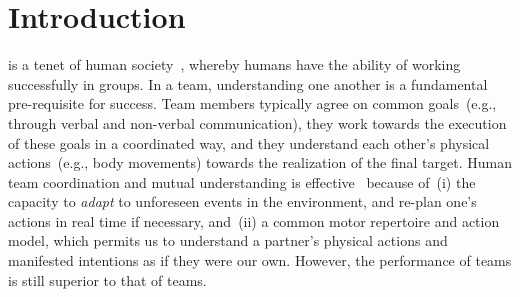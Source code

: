 
\section{Introduction}

 is a tenet of human society~\cite{turner:1975}, whereby humans have the ability of working successfully in groups.
In a team, understanding one another is a fundamental pre-requisite for success.
Team members typically agree on common goals~(e.g., through verbal and non-verbal communication), they work towards the execution of these goals in a coordinated way, and they understand each other's physical actions~(e.g., body movements) towards the realization of the final target.
Human team coordination and mutual understanding is effective~\cite{ramnani:2004:natureneuro} because of~(i) the capacity to \emph{adapt} to unforeseen events in the environment, and re-plan one's actions in real time if necessary, and~(ii) a common motor repertoire and action model, which permits us to understand a partner's physical actions and manifested intentions as if they were our own.
However, the performance of \hh{} teams is still superior to that of \hr{} teams.

